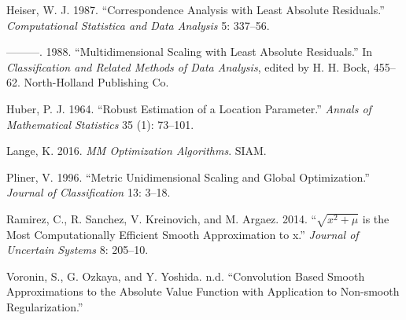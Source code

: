 \documentclass[
  12pt,
  letterpaper,
  DIV=11,
  numbers=noendperiod]{scrartcl}
\newlength{\cslhangindent}
\newenvironment{CSLReferences}[2] %
 {\begin{list}{}{%
  \setlength{\itemindent}{0pt}
  \setlength{\leftmargin}{0pt}
  \setlength{\parsep}{0pt}
  \ifodd #1
   \setlength{\leftmargin}{\cslhangindent}
   \setlength{\itemindent}{-1\cslhangindent}
  \fi
  \setlength{\itemsep}{#2\baselineskip}}}
 {\end{list}}
\begin{document}
\begin{CSLReferences}{1}{0}
Heiser, W. J. 1987. {``{Correspondence Analysis with Least Absolute
Residuals}.''} \emph{Computational Statistica and Data Analysis} 5:
337--56.

---------. 1988. {``{Multidimensional Scaling with Least Absolute
Residuals}.''} In \emph{Classification and Related Methods of Data
Analysis}, edited by H. H. Bock, 455--62. North-Holland Publishing Co.

Huber, P. J. 1964. {``Robust Estimation of a Location Parameter.''}
\emph{Annals of Mathematical Statistics} 35 (1): 73--101.

Lange, K. 2016. \emph{MM Optimization Algorithms}. SIAM.

Pliner, V. 1996. {``{Metric Unidimensional Scaling and Global
Optimization}.''} \emph{Journal of Classification} 13: 3--18.

Ramirez, C., R. Sanchez, V. Kreinovich, and M. Argaez. 2014.
{``{\(\sqrt{x^2+\mu}\) is the Most Computationally Efficient Smooth
Approximation to \vert{}x\vert{}}.''} \emph{Journal of Uncertain
Systems} 8: 205--10.

Voronin, S., G. Ozkaya, and Y. Yoshida. n.d. {``{Convolution Based
Smooth Approximations to the Absolute Value Function with Application to
Non-smooth Regularization}.''}

\end{CSLReferences}
\end{document}
